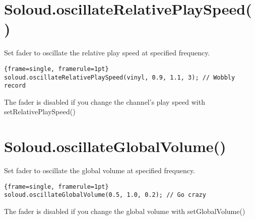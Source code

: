 \section{Soloud.oscillateRelativePlaySpeed()}
Set fader to oscillate the relative play speed at specified frequency.

\begin{lstlisting}{frame=single, framerule=1pt}
soloud.oscillateRelativePlaySpeed(vinyl, 0.9, 1.1, 3); // Wobbly record
\end{lstlisting}

The fader is disabled if you change the channel's play speed with setRelativePlaySpeed()

\section{Soloud.oscillateGlobalVolume()}
Set fader to oscillate the global volume at specified frequency.

\begin{lstlisting}{frame=single, framerule=1pt}
soloud.oscillateGlobalVolume(0.5, 1.0, 0.2); // Go crazy
\end{lstlisting}

The fader is disabled if you change the global volume with setGlobalVolume()
